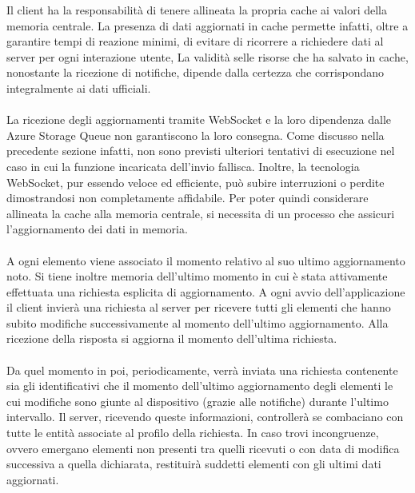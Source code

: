 Il client ha la responsabilità di tenere allineata
la propria cache ai valori della memoria centrale. 
La presenza di dati aggiornati in cache permette infatti,
oltre a garantire tempi di reazione minimi,
di evitare di ricorrere a richiedere dati al server per ogni interazione utente, 
La validità selle risorse che ha salvato in cache,
nonostante la ricezione di notifiche, 
dipende dalla certezza che corrispondano integralmente ai dati ufficiali.\\
\\
La ricezione degli aggiornamenti tramite WebSocket e 
la loro dipendenza dalle Azure Storage Queue non garantiscono la loro consegna.
Come discusso nella precedente sezione infatti, 
non sono previsti ulteriori tentativi di esecuzione nel caso in cui 
la funzione incaricata dell'invio fallisca.
Inoltre, la tecnologia WebSocket, pur essendo veloce ed efficiente, 
può subire interruzioni o perdite dimostrandosi non completamente affidabile.
Per poter quindi considerare allineata la cache alla memoria centrale, 
si necessita di un processo che assicuri l'aggiornamento dei dati in memoria.\\
\\
A ogni elemento viene associato il momento relativo al suo ultimo aggiornamento noto.
Si tiene inoltre memoria dell'ultimo momento in cui è stata 
attivamente effettuata una richiesta esplicita di aggiornamento.  
A ogni avvio dell'applicazione il client invierà una richiesta al server 
per ricevere tutti gli elementi che hanno subito modifiche 
successivamente al momento dell'ultimo aggiornamento.
Alla ricezione della risposta si aggiorna il momento dell'ultima richiesta.\\
\\
Da quel momento in poi, periodicamente, 
verrà inviata una richiesta contenente sia gli identificativi che il momento dell'ultimo aggiornamento 
degli elementi le cui modifiche sono giunte al dispositivo (grazie alle notifiche) durante l'ultimo intervallo.
Il server, ricevendo queste informazioni, controllerà se combaciano con tutte le entità 
associate al profilo della richiesta.
In caso trovi incongruenze, ovvero emergano elementi non presenti tra quelli ricevuti o 
con data di modifica successiva a quella dichiarata, 
restituirà suddetti elementi con gli ultimi dati aggiornati.\\
\\
\clearpage